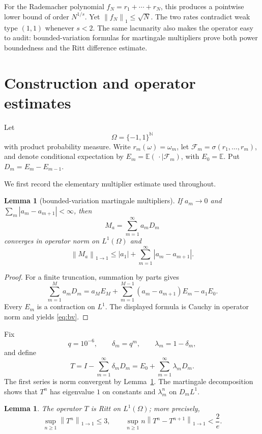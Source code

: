 \documentclass[11pt]{article}
\newtheorem{lemma}[theorem]{Lemma}
\theoremstyle{remark}
\newcommand{\E}{\mathbb E}
\newcommand{\N}{\mathbb N}
\newcommand{\norm}[1]{\left\lVert#1\right\rVert}
\begin{document}
For the Rademacher polynomial $f_N=r_1+\cdots+r_N$, this produces a pointwise
lower bound of order $N^{1/s}$.  Yet $\norm{f_N}_1\leq\sqrt N$.  The two rates
contradict weak type $(1,1)$ whenever $s<2$.  The same lacunarity also makes
the operator easy to audit: bounded-variation formulas for martingale
multipliers prove both power boundedness and the Ritt difference estimate.

\section{Construction and operator estimates}

Let
\[
 \Omega=\{-1,1\}^{\N}
\]
with product probability measure.  Write $r_m(\omega)=\omega_m$, let
$\mathcal F_m=\sigma(r_1,\ldots,r_m)$, and denote conditional expectation by
$E_m=\E(\,\cdot\mid\mathcal F_m)$, with $E_0=\E$.  Put
$D_m=E_m-E_{m-1}$.

We first record the elementary multiplier estimate used throughout.

\begin{lemma}[bounded-variation martingale multipliers]\label{lem:bv}
If $a_m\to0$ and $\sum_m|a_m-a_{m+1}|<\infty$, then
\[
 M_a=\sum_{m=1}^{\infty}a_mD_m
\]
converges in operator norm on $L^1(\Omega)$ and
\begin{equation}\label{eq:bv}
 \norm{M_a}_{1\to1}
 \leq |a_1|+\sum_{m=1}^{\infty}|a_m-a_{m+1}|.
\end{equation}
\end{lemma}

\begin{proof}
For a finite truncation, summation by parts gives
\[
 \sum_{m=1}^Ma_mD_m
 =a_ME_M+\sum_{m=1}^{M-1}(a_m-a_{m+1})E_m-a_1E_0.
\]
Every $E_m$ is a contraction on $L^1$.  The displayed formula is Cauchy in
operator norm and yields \eqref{eq:bv}.
\end{proof}

Fix
\[
 q=10^{-6},\qquad \delta_m=q^m,\qquad \lambda_m=1-\delta_m,
\]
and define
\begin{equation}\label{eq:T}
 T=I-\sum_{m=1}^{\infty}\delta_mD_m
   =E_0+\sum_{m=1}^{\infty}\lambda_mD_m.
\end{equation}
The first series is norm convergent by Lemma~\ref{lem:bv}.  The martingale
decomposition shows that $T^n$ has eigenvalue $1$ on constants and
$\lambda_m^n$ on $D_mL^1$.

\begin{lemma}\label{lem:ritt}
The operator $T$ is Ritt on $L^1(\Omega)$; more precisely,
\[
 \sup_{n\geq1}\norm{T^n}_{1\to1}\leq3,
 \qquad
 \sup_{n\geq1}n\norm{T^n-T^{n+1}}_{1\to1}<\frac2e.
\]
\end{lemma}
\end{document}
